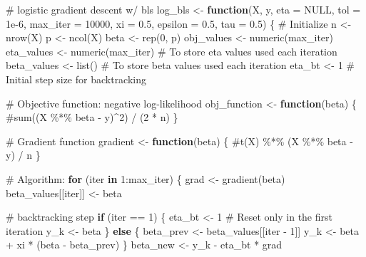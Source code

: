 \documentclass[
  letterpaper,
  DIV=11,
  numbers=noendperiod]{scrartcl}
\newenvironment{Shaded}{\begin{snugshade}}{\end{snugshade}}
\newcommand{\AttributeTok}[1]{\textcolor[rgb]{0.40,0.45,0.13}{#1}}
\newcommand{\CommentTok}[1]{\textcolor[rgb]{0.37,0.37,0.37}{#1}}
\newcommand{\ConstantTok}[1]{\textcolor[rgb]{0.56,0.35,0.01}{#1}}
\newcommand{\ControlFlowTok}[1]{\textcolor[rgb]{0.00,0.23,0.31}{\textbf{#1}}}
\newcommand{\DecValTok}[1]{\textcolor[rgb]{0.68,0.00,0.00}{#1}}
\newcommand{\FloatTok}[1]{\textcolor[rgb]{0.68,0.00,0.00}{#1}}
\newcommand{\FunctionTok}[1]{\textcolor[rgb]{0.28,0.35,0.67}{#1}}
\newcommand{\NormalTok}[1]{\textcolor[rgb]{0.00,0.23,0.31}{#1}}
\newcommand{\OtherTok}[1]{\textcolor[rgb]{0.00,0.23,0.31}{#1}}
\newcommand{\SpecialCharTok}[1]{\textcolor[rgb]{0.37,0.37,0.37}{#1}}
\begin{document}
\begin{Shaded}
\begin{Highlighting}[]
\CommentTok{\# logistic gradient descent w/ bls}
\NormalTok{log\_bls }\OtherTok{\textless{}{-}} \ControlFlowTok{function}\NormalTok{(X, y, }\AttributeTok{eta =} \ConstantTok{NULL}\NormalTok{, }\AttributeTok{tol =} \FloatTok{1e{-}6}\NormalTok{, }\AttributeTok{max\_iter =} \DecValTok{10000}\NormalTok{, }\AttributeTok{xi =} \FloatTok{0.5}\NormalTok{, }\AttributeTok{epsilon =} \FloatTok{0.5}\NormalTok{, }\AttributeTok{tau =} \FloatTok{0.5}\NormalTok{) \{}
  \CommentTok{\# Initialize}
\NormalTok{  n }\OtherTok{\textless{}{-}} \FunctionTok{nrow}\NormalTok{(X)}
\NormalTok{  p }\OtherTok{\textless{}{-}} \FunctionTok{ncol}\NormalTok{(X)}
\NormalTok{  beta }\OtherTok{\textless{}{-}} \FunctionTok{rep}\NormalTok{(}\DecValTok{0}\NormalTok{, p)}
\NormalTok{  obj\_values }\OtherTok{\textless{}{-}} \FunctionTok{numeric}\NormalTok{(max\_iter)}
\NormalTok{  eta\_values }\OtherTok{\textless{}{-}} \FunctionTok{numeric}\NormalTok{(max\_iter)  }\CommentTok{\# To store eta values used each iteration}
\NormalTok{  beta\_values }\OtherTok{\textless{}{-}} \FunctionTok{list}\NormalTok{() }\CommentTok{\# To store beta values used each iteration}
\NormalTok{  eta\_bt }\OtherTok{\textless{}{-}} \DecValTok{1}  \CommentTok{\# Initial step size for backtracking}
  
  \CommentTok{\# Objective function: negative log{-}likelihood}
\NormalTok{  obj\_function }\OtherTok{\textless{}{-}} \ControlFlowTok{function}\NormalTok{(beta) \{}
    \CommentTok{\#sum((X \%*\% beta {-} y)\^{}2) / (2 * n)}
\NormalTok{  \}}
  
  \CommentTok{\# Gradient function}
\NormalTok{  gradient }\OtherTok{\textless{}{-}} \ControlFlowTok{function}\NormalTok{(beta) \{}
    \CommentTok{\#t(X) \%*\% (X \%*\% beta {-} y) / n}
\NormalTok{  \}}

  \CommentTok{\# Algorithm:}
  \ControlFlowTok{for}\NormalTok{ (iter }\ControlFlowTok{in} \DecValTok{1}\SpecialCharTok{:}\NormalTok{max\_iter) \{}
\NormalTok{    grad }\OtherTok{\textless{}{-}} \FunctionTok{gradient}\NormalTok{(beta)}
\NormalTok{    beta\_values[[iter]] }\OtherTok{\textless{}{-}}\NormalTok{ beta}
    
    \CommentTok{\# backtracking step}
    \ControlFlowTok{if}\NormalTok{ (iter }\SpecialCharTok{==} \DecValTok{1}\NormalTok{) \{}
\NormalTok{      eta\_bt }\OtherTok{\textless{}{-}} \DecValTok{1} \CommentTok{\# Reset only in the first iteration}
\NormalTok{      y\_k }\OtherTok{\textless{}{-}}\NormalTok{ beta}
\NormalTok{    \}}
    \ControlFlowTok{else}\NormalTok{ \{}
\NormalTok{      beta\_prev }\OtherTok{\textless{}{-}}\NormalTok{ beta\_values[[iter }\SpecialCharTok{{-}} \DecValTok{1}\NormalTok{]]}
\NormalTok{      y\_k }\OtherTok{\textless{}{-}}\NormalTok{ beta }\SpecialCharTok{+}\NormalTok{ xi }\SpecialCharTok{*}\NormalTok{ (beta }\SpecialCharTok{{-}}\NormalTok{ beta\_prev)}
\NormalTok{    \}}
\NormalTok{    beta\_new }\OtherTok{\textless{}{-}}\NormalTok{ y\_k }\SpecialCharTok{{-}}\NormalTok{ eta\_bt }\SpecialCharTok{*}\NormalTok{ grad}
    

\end{Highlighting}
\end{Shaded}
\end{document}

